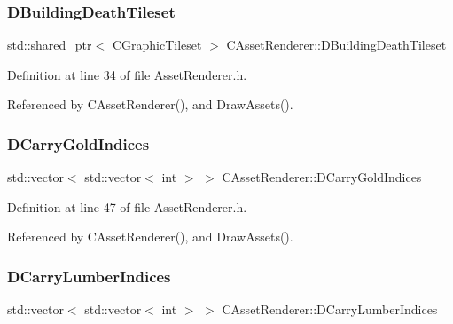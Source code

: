 \subsubsection{\texorpdfstring{D\+Building\+Death\+Tileset}{DBuildingDeathTileset}}
{\footnotesize\ttfamily std\+::shared\+\_\+ptr$<$ \hyperlink{classCGraphicTileset}{C\+Graphic\+Tileset} $>$ C\+Asset\+Renderer\+::\+D\+Building\+Death\+Tileset\hspace{0.3cm}{\ttfamily [protected]}}



Definition at line 34 of file Asset\+Renderer.\+h.



Referenced by C\+Asset\+Renderer(), and Draw\+Assets().

\hypertarget{classCAssetRenderer_aaf8c772b7d3fbe8c145282e5106749d6}{}\label{classCAssetRenderer_aaf8c772b7d3fbe8c145282e5106749d6} 
\subsubsection{\texorpdfstring{D\+Carry\+Gold\+Indices}{DCarryGoldIndices}}
{\footnotesize\ttfamily std\+::vector$<$ std\+::vector$<$ int $>$ $>$ C\+Asset\+Renderer\+::\+D\+Carry\+Gold\+Indices\hspace{0.3cm}{\ttfamily [protected]}}



Definition at line 47 of file Asset\+Renderer.\+h.



Referenced by C\+Asset\+Renderer(), and Draw\+Assets().

\hypertarget{classCAssetRenderer_a986dc401334deb267cb772ff0650fcb6}{}\label{classCAssetRenderer_a986dc401334deb267cb772ff0650fcb6} 
\subsubsection{\texorpdfstring{D\+Carry\+Lumber\+Indices}{DCarryLumberIndices}}
{\footnotesize\ttfamily std\+::vector$<$ std\+::vector$<$ int $>$ $>$ C\+Asset\+Renderer\+::\+D\+Carry\+Lumber\+Indices\hspace{0.3cm}{\ttfamily [protected]}}



